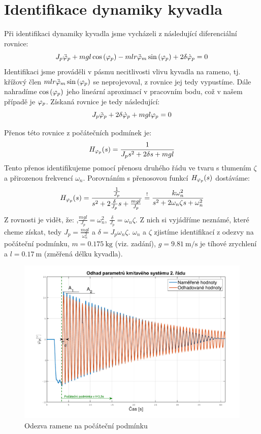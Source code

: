 \documentclass[11pt,a4paper]{article}
\begin{document}


\section{Identifikace dynamiky kyvadla}
Při identifikaci dynamiky kyvadla jsme vycházeli z následující diferenciální rovnice:
$$
J_p \phidd{p} + m g l \coss{\phin{p}} - m l r \phidd{m} \sinn{\phin{p}} + 2 \delta \phid{p} = 0
$$
Identifikaci jsme prováděli v pásmu necitlivosti vlivu kyvadla na rameno, tj. křížový člen  $m l r \phidd{m} \sinn{\phin{p}}$ se neprojevoval, z rovnice jej tedy vypustíme. Dále nahradíme $\coss{\phin{p}}$ jeho lineární aproximací v pracovním bodu, což v našem případě je $\phin{p}$. Získaná rovnice je tedy následující:
$$
J_p \phidd{p} + 2 \delta \phid{p} + m g l \phin{p} = 0
$$


Přenos této rovnice z počátečních podmínek je: 
$$
H_{\phin{p}}(s) = \frac{1}{J_p s^2 + 2 \delta s + m g l}
$$
\newcommand{\wn}{\omega_n}
\newcommand{\ut}{\zeta} %
Tento přenos identifikujeme pomocí přenosu druhého řádu ve tvaru s tlumením $\ut$ a přirozenou frekvencí $\wn$. Porovnáním s přenosovou funkcí $H_{\phin{p}}(s)$ dostáváme:
$$
H_{\phin{p}}(s) = \frac{\frac{1}{J_p}}{s^2 + 2 \frac{\delta}{J_p} s + \frac{m g l}{J_p}}
\overset{!}{=} 
\frac{k \wn^2}{s^2 + 2 \wn \ut s + \wn^2}
$$
Z rovnosti je vidět, že: ,$\frac{m g l}{J_p} = \wn^2$, $\frac{\delta}{J_p} = \wn \ut$. %
Z nich si vyjádříme neznámé, které cheme získat, tedy $J_p = \frac{m g l}{\wn^2}$ a $\delta = J_p \wn \ut$. $\wn$ a $\ut$ zjistíme identifikací z odezvy na počáteční podmínku, $m = \SI{0,175}{\kg}$ (viz. zadání), $g = \SI{9,81}{\meter \per \second}$ je tíhové zrychlení a $l = \SI{0,17}{\metre}$ (změřená délku kyvadla).

\begin{figure}[H]
	\centering
    \includegraphics[scale=.6]{Odhad_phip.pdf}
    \caption{Odezva ramene na počáteční podmínku}
\end{figure}
\end{document}
